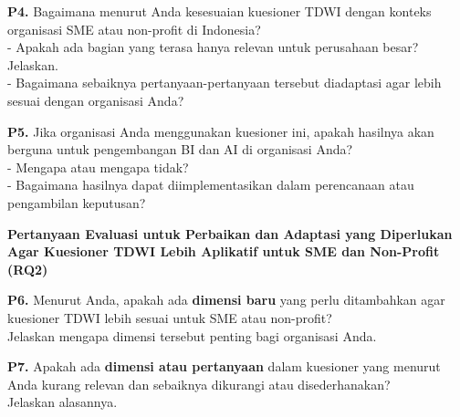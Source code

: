 \documentclass{article}
\begin{document}
\vspace{15pt}

\textbf{P4.} Bagaimana menurut Anda kesesuaian kuesioner TDWI dengan konteks organisasi SME atau non-profit di Indonesia?\\
- Apakah ada bagian yang terasa hanya relevan untuk perusahaan besar? Jelaskan.\\
- Bagaimana sebaiknya pertanyaan-pertanyaan tersebut diadaptasi agar lebih sesuai dengan organisasi Anda?

\vspace{10pt}
\noindent\framebox[\textwidth][l]{\parbox[t][5cm][t]{\textwidth}{}}

\vspace{15pt}

\textbf{P5.} Jika organisasi Anda menggunakan kuesioner ini, apakah hasilnya akan berguna untuk pengembangan BI dan AI di organisasi Anda?\\
- Mengapa atau mengapa tidak?\\
- Bagaimana hasilnya dapat diimplementasikan dalam perencanaan atau pengambilan keputusan?

\vspace{10pt}
\noindent\framebox[\textwidth][l]{\parbox[t][6cm][t]{\textwidth}{}}


\vspace{20pt}

\noindent
\large{\textbf{Pertanyaan Evaluasi untuk Perbaikan dan Adaptasi yang Diperlukan Agar Kuesioner TDWI Lebih Aplikatif untuk SME dan Non-Profit (RQ2)}}

\vspace{15pt}

\textbf{P6.} Menurut Anda, apakah ada \textbf{dimensi baru} yang perlu ditambahkan agar kuesioner TDWI lebih sesuai untuk SME atau non-profit?\\
Jelaskan mengapa dimensi tersebut penting bagi organisasi Anda.

\vspace{10pt}
\noindent\framebox[\textwidth][l]{\parbox[t][5cm][t]{\textwidth}{}}

\vspace{15pt}

\textbf{P7.} Apakah ada \textbf{dimensi atau pertanyaan} dalam kuesioner yang menurut Anda kurang relevan dan sebaiknya dikurangi atau disederhanakan?\\
Jelaskan alasannya.

\vspace{10pt}
\noindent\framebox[\textwidth][l]{\parbox[t][5cm][t]{\textwidth}{}}
\end{document}
